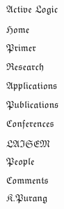\documentclass[fullpage,11pt]{article}
\begin{document}
\Huge
$\mathfrak{A}\mathfrak{c}\mathfrak{t}\mathfrak{i}\mathfrak{v}\mathfrak{e}$
$\mathfrak{L}\mathfrak{o}\mathfrak{g}\mathfrak{i}\mathfrak{c}$

\Huge
$\mathfrak{Home}$

\Huge
$\mathfrak{Primer}$

\Huge
$\mathfrak{Research}$

\Huge
$\mathfrak{Applications}$

\Huge
$\mathfrak{Publications}$

\Huge
$\mathfrak{Conferences}$

\Huge
$\mathfrak{LAISEM}$

\Huge
$\mathfrak{People}$

\Huge
$\mathfrak{Comments}$

\Huge
$\mathfrak{K. Purang}$
\end{document}
